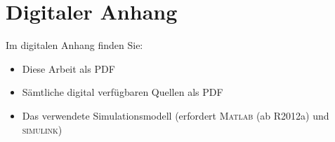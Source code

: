 
\chapter{Digitaler Anhang}
\label{an_Digital}
Im digitalen Anhang finden Sie:
\begin{itemize}
	\item Diese Arbeit als PDF
	\item Sämtliche digital verfügbaren Quellen als PDF
	\item Das verwendete Simulationsmodell (erfordert \textsc{Matlab} (ab R2012a) und \textsc{simulink})
\end{itemize}
